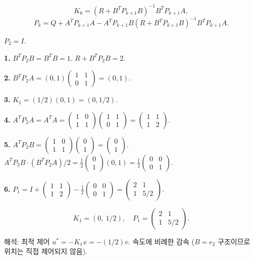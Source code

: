 \documentclass[11pt,a4paper]{article}
\begin{document}
\begin{sol}
\[
K_k = (R + B^T P_{k+1} B)^{-1} B^T P_{k+1} A,
\]
\[
P_k = Q + A^T P_{k+1} A - A^T P_{k+1} B (R + B^T P_{k+1} B)^{-1} B^T P_{k+1} A.
\]

$P_2 = I$.

\textbf{1.} $B^T P_2 B = B^T B = 1$. $R + B^T P_2 B = 2$.

\textbf{2.} $B^T P_2 A = (0, 1)\begin{pmatrix}1 & 1\\0 & 1\end{pmatrix} = (0, 1)$.

\textbf{3.} $K_1 = (1/2)(0, 1) = (0, 1/2)$.

\textbf{4.} $A^T P_2 A = A^T A = \begin{pmatrix}1 & 0\\1 & 1\end{pmatrix}\begin{pmatrix}1 & 1\\0 & 1\end{pmatrix} = \begin{pmatrix}1 & 1\\1 & 2\end{pmatrix}$.

\textbf{5.} $A^T P_2 B = \begin{pmatrix}1 & 0\\1 & 1\end{pmatrix}\begin{pmatrix}0\\1\end{pmatrix} = \begin{pmatrix}0\\1\end{pmatrix}$.
$A^T P_2 B \cdot (B^T P_2 A)/2 = \frac{1}{2}\begin{pmatrix}0\\1\end{pmatrix}(0, 1) = \frac{1}{2}\begin{pmatrix}0 & 0\\0 & 1\end{pmatrix}$.

\textbf{6.} $P_1 = I + \begin{pmatrix}1 & 1\\1 & 2\end{pmatrix} - \frac{1}{2}\begin{pmatrix}0 & 0\\0 & 1\end{pmatrix} = \begin{pmatrix}2 & 1\\1 & 5/2\end{pmatrix}$.

\[
\boxed{K_1 = (0,\ 1/2),\quad P_1 = \begin{pmatrix}2 & 1\\1 & 5/2\end{pmatrix}.}
\]

해석: 최적 제어 $u^* = -K_1 x = -(1/2)v$. 속도에 비례한 감속 ($B = e_2$ 구조이므로 위치는 직접 제어되지 않음).
\end{sol}
\end{document}

